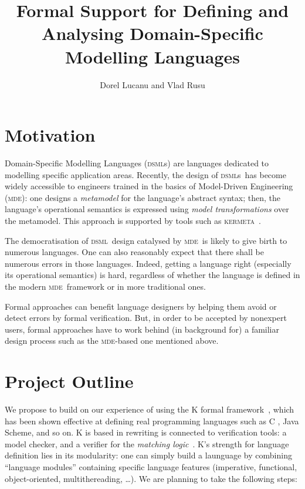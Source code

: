 \documentclass[a4paper,11pt,twoside]{article}
\title{Formal Support for Defining and Analysing Domain-Specific Modelling Languages}
\author{Dorel Lucanu and Vlad Rusu}
\newcommand{\dsml}{\textsc{dsml}}
\newcommand{\dsmls}{\textsc{dsml}s}
\newcommand{\mde}{\textsc{mde}}
\newcommand{\kmt}{\textsc{kermeta}}
\begin{document}
\pagestyle{plain}
\maketitle

\section*{Motivation}
Domain-Specific Modelling Languages (\dsmls) are languages dedicated to modelling specific application areas. Recently, the design of \dsmls\
has become widely accessible to engineers trained in the basics of Model-Driven Engineering (\mde): one designs
 a \emph{metamodel} for the language's abstract syntax; then, the language's operational semantics is expressed using \emph{model transformations} over
the metamodel. This approach is supported by tools such as \kmt~\cite{DBLP:conf/uml/MullerFJ05}.

The democratisation of  \dsml\ design catalysed by \mde\ is likely to give birth to  numerous languages. 
One can also reasonably expect that there shall be  numerous errors in those languages. Indeed, getting a language right (especially its operational semantics)
is  hard, regardless of whether the language is defined  in the  modern \mde\ framework or in   more traditional ones.

Formal approaches can benefit language designers by helping them  avoid or detect errors by formal verification. But, in order to be
accepted by nonexpert users, formal approaches have to 
work behind (in background for) a familiar design process  such as the \mde-based one mentioned above.



\section*{Project Outline}
We propose to build on our experience of using the K formal framework~\cite{rosu-serbanuta-2010-jlap}, which has been shown effective at  defining real programming languages such as C \cite{ellison-rosu-2010-tr},  
Java \cite{farzan-chen-meseguer-rosu-2004-cav}
Scheme\cite{meredith-hills-rosu-2007-tr-b}, and so on.
K is based in rewriting is connected to verification tools: a model checker, and a verifier 
for the \emph{matching logic}~\cite{rosu-ellison-schulte-2010-amast}.
K's strength for language definition lies in its modularity: one can simply build a launguage by combining ``language modules'' containing specific language features
 (imperative, functional, object-oriented, multithereading, \ldots). We are planning to take the following steps:
\end{document}
